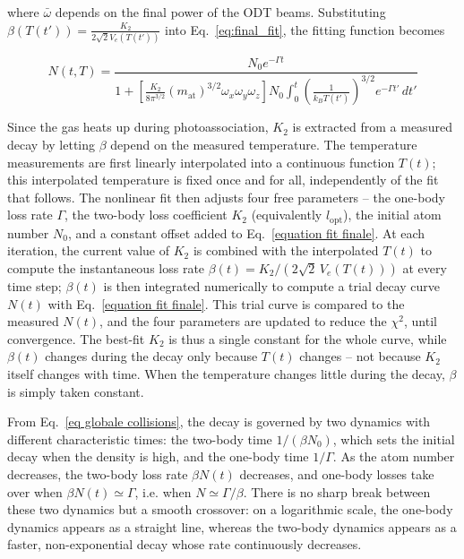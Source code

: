 where $\bar{\omega}$ depends on the final power of the ODT beams. Substituting $\beta(T(t')) = \frac{K_2}{2\sqrt{2}V_e(T(t'))}$ into Eq.~\ref{eq:final_fit}, the fitting function becomes

\begin{equation}
    N(t,T) = \frac{N_0 e^{-\Gamma t}}{1 + \left[ \frac{K_2}{8\pi^{3/2}} \left( m_{\text{at}} \right)^{3/2} \omega_x\omega_y\omega_z \right] N_0 \int_{0}^{t} \left( \frac{1}{k_B T(t')} \right)^{3/2} e^{-\Gamma t'} \, dt'}
\label{equation fit finale}
\end{equation}

Since the gas heats up during photoassociation, $K_2$ is extracted from a measured decay by letting $\beta$ depend on the
measured temperature. The temperature measurements are first linearly interpolated into a continuous function $T(t)$; this
interpolated temperature is fixed once and for all, independently of the fit that
follows. The nonlinear fit then adjusts four free parameters
-- the one-body loss rate $\Gamma$, the two-body loss coefficient $K_2$
(equivalently $l_{\text{opt}}$), the initial atom number $N_0$, and a constant
offset added to Eq.~\ref{equation fit finale}. At each iteration, the current value of $K_2$ is combined with the
interpolated $T(t)$ to compute the instantaneous loss rate
$\beta(t) = K_2/(2\sqrt{2}\,V_e(T(t)))$ at every time step; $\beta(t)$ is then
integrated numerically to compute a trial decay curve $N(t)$ with
Eq.~\ref{equation fit finale}. This trial curve is compared to the measured $N(t)$, and
the four parameters are updated to reduce the $\chi^2$, until convergence.
The best-fit $K_2$ is thus a single constant for the whole curve, while $\beta(t)$ changes during the
decay only because $T(t)$ changes -- not because $K_2$ itself changes with time. When the temperature
changes little during the decay, $\beta$ is simply taken constant.

From Eq.~\ref{eq globale collisions}, the decay is governed by two dynamics with different
characteristic times: the two-body time $1/(\beta N_0)$, which sets the initial decay when the
density is high, and the one-body time $1/\Gamma$. As the atom number decreases, the two-body
loss rate $\beta N(t)$ decreases, and one-body losses take over when $\beta N(t)\simeq\Gamma$,
i.e. when $N\simeq\Gamma/\beta$. There is no sharp break between these two dynamics but a
smooth crossover: on a logarithmic scale, the one-body dynamics appears as a straight line,
whereas the two-body dynamics appears as a faster, non-exponential decay whose rate
continuously decreases.

